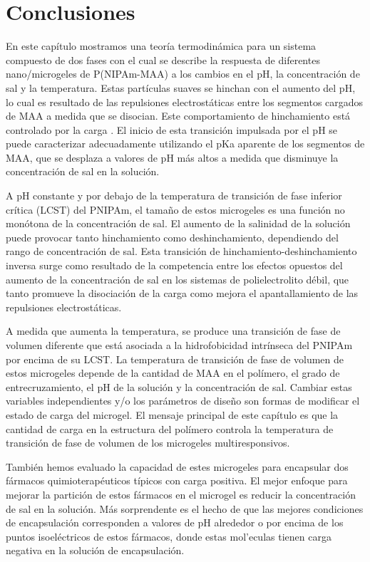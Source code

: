 \section{Conclusiones}

En este cap\'itulo mostramos una teor\'ia termodin\'amica  para un sistema compuesto de dos fases con el cual se describe la respuesta de diferentes nano/microgeles de P(NIPAm-MAA) a los cambios en el pH, la concentraci\'on de sal y la temperatura.
Estas part\'iculas suaves se hinchan con el aumento del pH, lo cual es resultado de las repulsiones electrost\'aticas entre los segmentos cargados de MAA a medida que se disocian.
Este comportamiento de hinchamiento est\'a controlado por la carga \cite{FernandezNieves2000}.
El inicio de esta transici\'on impulsada por el pH se puede caracterizar adecuadamente utilizando el pKa aparente de los segmentos de MAA, que se desplaza a valores de pH m\'as altos a medida que disminuye la concentraci\'on de sal en la soluci\'on.

A pH constante y por debajo de la temperatura de transici\'on de fase inferior cr\'itica (LCST) del PNIPAm, el tama\~no de estos microgeles es una funci\'on no mon\'otona de la concentraci\'on de sal.
El aumento de la salinidad de la soluci\'on puede provocar tanto hinchamiento como deshinchamiento, dependiendo del rango de concentraci\'on de sal.
Esta transici\'on de hinchamiento-deshinchamiento inversa surge como resultado de la competencia entre los efectos opuestos del aumento de la concentraci\'on de sal en los sistemas de polielectrolito d\'ebil, que tanto promueve la disociaci\'on de la carga como mejora el apantallamiento de las repulsiones electrost\'aticas.


A medida que aumenta la temperatura, se produce una transici\'on de fase de volumen diferente que est\'a asociada a la hidrofobicidad intr\'inseca del PNIPAm por encima de su LCST.
La temperatura de transici\'on de fase de volumen de estos microgeles depende de la cantidad de MAA en el pol\'imero, el grado de entrecruzamiento, el pH de la soluci\'on y la concentraci\'on de sal.
Cambiar estas variables independientes y/o los par\'ametros de dise\~no son formas de modificar el estado de carga del microgel.
El mensaje principal de este cap\'itulo es que la cantidad de carga en la estructura del pol\'imero controla la temperatura de transici\'on de fase de volumen de los microgeles multiresponsivos.

Tambi\'en hemos evaluado la capacidad de estes microgeles para encapsular dos f\'armacos quimioterap\'euticos t\'ipicos con carga positiva.
El mejor enfoque para mejorar la partici\'on de estos f\'armacos en el microgel es reducir la concentraci\'on de sal en la soluci\'on.
M\'as sorprendente es el hecho de que las mejores condiciones de encapsulaci\'on corresponden a valores de pH alrededor o por encima de los puntos isoel\'ectricos de estos f\'armacos, donde estas mol'eculas tienen carga negativa en la soluci\'on de encapsulaci\'on. 